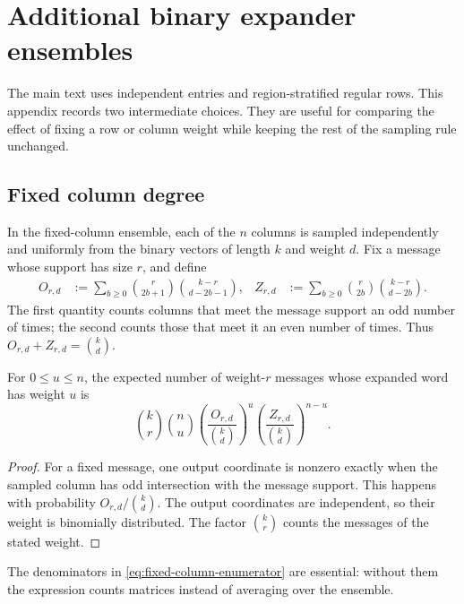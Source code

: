 \section{Additional binary expander ensembles}
\label{app:additional-ensembles}

The main text uses independent entries and region-stratified regular rows.
This appendix records two intermediate choices.  They are useful for comparing
the effect of fixing a row or column weight while keeping the rest of the
sampling rule unchanged.

\subsection{Fixed column degree}

In the fixed-column ensemble, each of the $n$ columns is sampled independently
and uniformly from the binary vectors of length $k$ and weight $d$.  Fix a
message whose support has size $r$, and define
\begin{align}
 O_{r,d}&:=\sum_{b\geq0}\binom{r}{2b+1}\binom{k-r}{d-2b-1},&
 Z_{r,d}&:=\sum_{b\geq0}\binom{r}{2b}\binom{k-r}{d-2b}.
 \label{eq:fixed-column-counts}
\end{align}
The first quantity counts columns that meet the message support an odd number
of times; the second counts those that meet it an even number of times.  Thus
$O_{r,d}+Z_{r,d}=\binom{k}{d}$.

\begin{lemma}
\label{lem:fixed-column-enumerator}
For $0\leq u\leq n$, the expected number of weight-$r$ messages whose
expanded word has weight $u$ is
\begin{equation}
 \binom{k}{r}\binom{n}{u}
 \left(\frac{O_{r,d}}{\binom{k}{d}}\right)^u
 \left(\frac{Z_{r,d}}{\binom{k}{d}}\right)^{n-u}.
 \label{eq:fixed-column-enumerator}
\end{equation}
\end{lemma}

\begin{proof}
For a fixed message, one output coordinate is nonzero exactly when the sampled
column has odd intersection with the message support.  This happens with
probability $O_{r,d}/\binom{k}{d}$.  The output coordinates are independent,
so their weight is binomially distributed.  The factor $\binom{k}{r}$ counts
the messages of the stated weight.
\end{proof}

The denominators in \eqref{eq:fixed-column-enumerator} are essential: without
them the expression counts matrices instead of averaging over the ensemble.

